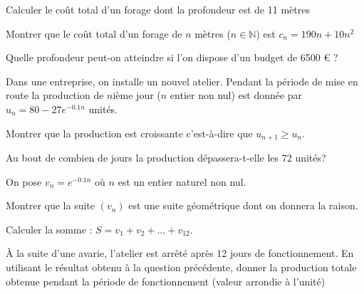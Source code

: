 \documentclass[a4paper,12pt]{scrartcl}
\begin{document}

\question{}
Calculer le coût total d'un forage dont la profondeur est de 11 mètres

\question{}
Montrer que le coût total d'un forage de $n$ mètres ($n \in \mathbb{N}$) est $c_n = 190n + 10n^2$

\question{}
Quelle profondeur peut-on atteindre si l'on dispose d'un budget de  6500 € ?



Dans une entreprise, on installe un nouvel atelier. Pendant la période de mise en route la production de $n$ième jour ($n$ entier non nul) est donnée par $u_n = 80 - 27 e^{-0.1n}$ unités.

\question{}
Montrer que la production est croissante c'est-à-dire que $u_{n+1} \ge u_n$.

\question{}
Au bout de combien de  jours la production dépassera-t-elle les 72 unités?

\question{}
On pose $v_n = e^{-0.1n}$ où $n$ est un entier naturel non nul.

\subquestion{}
Montrer que la suite $(v_n)$ est une suite géométrique dont on donnera la raison.

\subquestion{}
Calculer la somme : $S = v_1 + v_2 + \ldots + v_{12}$. 

\question{}
À la suite d'une avarie, l'atelier est arrêté après 12 jours de fonctionnement. En utilisant le résultat obtenu à la question précédente, donner la production totale obtenue pendant la période de fonctionnement (valeur arrondie à l'unité)
\end{document}
